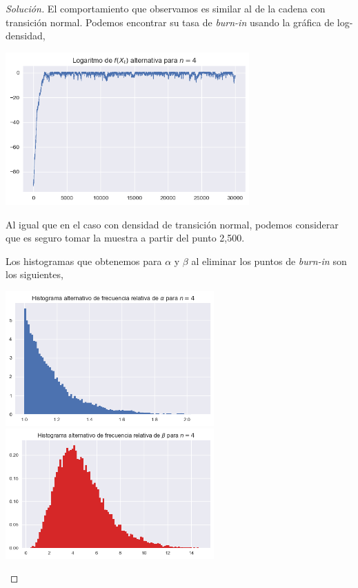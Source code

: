 \documentclass{article}
\begin{document}
\begin{enumerate}
\begin{proof}[Solución]
        El comportamiento que observamos es similar al de la cadena con transición normal.
        Podemos encontrar su tasa de \textit{burn-in} usando la gráfica de log-densidad,

        \begin{center}
            \includegraphics[width=0.7\textwidth]{tarea7/logsemic4.png}
        \end{center}

        Al igual que en el caso con densidad de transición normal, podemos considerar que
        es seguro tomar la muestra a partir del punto 2,500.

        Los histogramas que obtenemos para $\alpha$ y $\beta$ al eliminar los puntos de \textit{burn-in}
        son los siguientes,

        \begin{center}
            \includegraphics[width=0.6\textwidth]{tarea7/histalphasemic4.png}
            \includegraphics[width=0.6\textwidth]{tarea7/histbetasemic4.png}
        \end{center}


\end{proof}
\end{enumerate}
\end{document}
